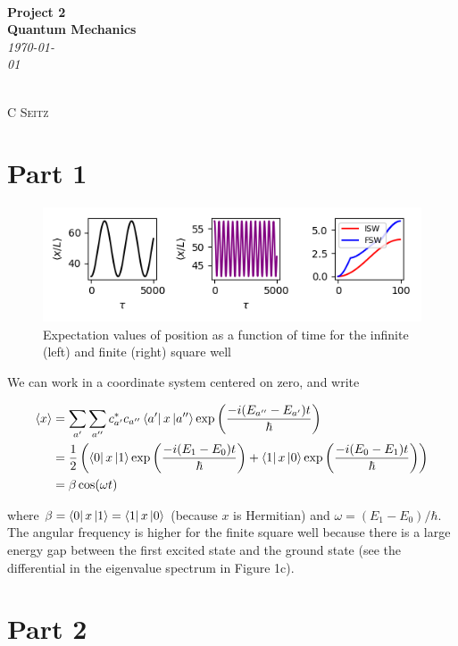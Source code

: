 \documentclass[12pt]{article}
\theoremstyle{definition}
\begin{document}
 {\noindent\Huge\bf  \\[0.5\baselineskip] {\selectfont  Project 2}         }\\[2\baselineskip] %
{ {\bf {}\selectfont Quantum Mechanics}\\ {\textit{\selectfont     \today}}}~~~~~~~~~~~~~~~~~~~~~~~~~~~~~~~~~~~~~~~~~~~~~~~~~~~~~~~~~~~~~~~~~~~~~~~~~~~~~    {\large \textsc{C Seitz}
\\[1.4\baselineskip] 

\section{Part 1}


\begin{figure}
\includegraphics[scale=1.25]{Figure_1.png}
\centering
\caption{Expectation values of position as a function of time for the infinite (left) and finite (right) square well}
\end{figure}

We can work in a coordinate system centered on zero, and write

\begin{align*}
\langle x \rangle &= \sum_{a'}\sum_{a''}c_{a'}^{*}c_{a''}\bra{a'}x\ket{a''}\exp\left(\frac{-i(E_{a''}-E_{a'})t}{\hbar}\right)\\
&= \frac{1}{2}\left(\bra{0}x\ket{1}\exp\left(\frac{-i(E_{1}-E_{0})t}{\hbar}\right) + \bra{1}x\ket{0}\exp\left(\frac{-i(E_{0}-E_{1})t}{\hbar}\right)\right)\\
&= \beta \cos(\omega t)
\end{align*}

where $\beta = \bra{0}x\ket{1} = \bra{1}x\ket{0}$ (because $x$ is Hermitian) and $\omega = (E_1-E_0)/\hbar$. The angular frequency is higher for the finite square well because there is a large energy gap between the first excited state and the ground state (see the differential in the eigenvalue spectrum in Figure 1c).

\section{Part 2}

}
\end{document}
